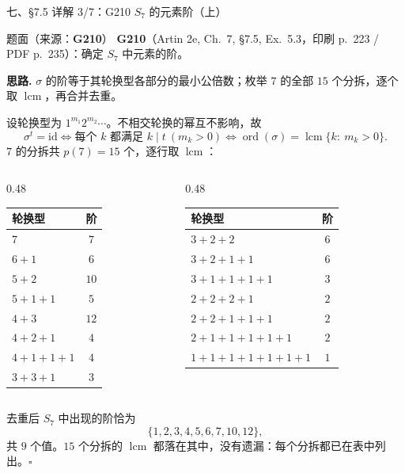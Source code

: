 \documentclass[aspectratio=169,10pt,fontset=none]{ctexbeamer}
\newcommand{\ex}[1]{\textcolor{accent}{\footnotesize\bfseries #1}}
\newcommand{\key}[1]{\textcolor{ink}{\bfseries #1}}
\begin{document}
\begin{frame}[t]{七、\S7.5 详解 3/7：G210 $S_7$ 的元素阶（上）}
\label{ex:G210}
\scriptsize
\begin{block}{\footnotesize 题面（来源：\ex{G210}）}
\scriptsize
\ex{G210}（Artin 2e, Ch.~7, \S7.5, Ex.~5.3，印刷 p.~223 / PDF p.~235）：确定 $S_7$ 中元素的阶。
\end{block}
\key{思路.} $\sigma$ 的阶等于其轮换型各部分的最小公倍数；枚举 $7$ 的全部 $15$ 个分拆，逐个取 $\operatorname{lcm}$，再合并去重。

设轮换型为 $1^{m_1}2^{m_2}\cdots$。不相交轮换的幂互不影响，故
\[ \sigma^t=\mathrm{id}\iff\text{每个 }k\text{ 都满足 }k\mid t\ (m_k>0)\iff \operatorname{ord}(\sigma)=\operatorname{lcm}\{k:\ m_k>0\}. \]
$7$ 的分拆共 $p(7)=15$ 个，逐行取 $\operatorname{lcm}$：
\begin{columns}[T,onlytextwidth]
  \begin{column}{0.48\textwidth}
    \centering
    \renewcommand{\arraystretch}{1.05}\setlength{\tabcolsep}{4pt}
    \begin{tabular}{@{}l c@{}}
      \toprule
      轮换型 & 阶\\
      \midrule
      $7$ & $7$\\
      $6+1$ & $6$\\
      $5+2$ & $10$\\
      $5+1+1$ & $5$\\
      $4+3$ & $12$\\
      $4+2+1$ & $4$\\
      $4+1+1+1$ & $4$\\
      $3+3+1$ & $3$\\
      \bottomrule
    \end{tabular}
  \end{column}
  \begin{column}{0.48\textwidth}
    \centering
    \renewcommand{\arraystretch}{1.05}\setlength{\tabcolsep}{4pt}
    \begin{tabular}{@{}l c@{}}
      \toprule
      轮换型 & 阶\\
      \midrule
      $3+2+2$ & $6$\\
      $3+2+1+1$ & $6$\\
      $3+1+1+1+1$ & $3$\\
      $2+2+2+1$ & $2$\\
      $2+2+1+1+1$ & $2$\\
      $2+1+1+1+1+1$ & $2$\\
      $1+1+1+1+1+1+1$ & $1$\\
      \bottomrule
    \end{tabular}
  \end{column}
\end{columns}
\vspace{2pt}
去重后 $S_7$ 中出现的阶恰为
\[ \{1,2,3,4,5,6,7,10,12\}, \]
共 $9$ 个值。$15$ 个分拆的 $\operatorname{lcm}$ 都落在其中，没有遗漏：每个分拆都已在表中列出。$\square$
\end{frame}
\end{document}
